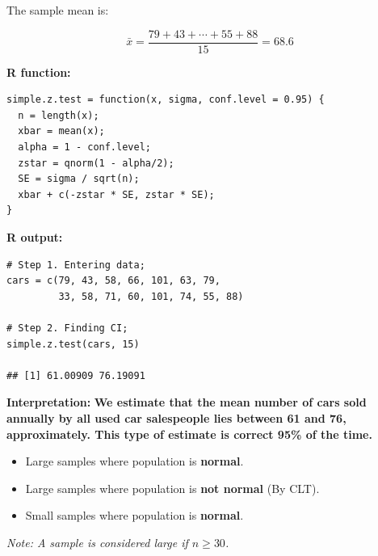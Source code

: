 \noindent The sample mean is:

\[
\bar{x} = \frac{79 + 43 + \cdots + 55 + 88}{15} = 68.6
\]

\vspace{1em}

\noindent\textbf{R function:}

\begin{tcolorbox}[colback=gray!10, colframe=gray!50, arc=2mm]
\begin{verbatim}
simple.z.test = function(x, sigma, conf.level = 0.95) {
  n = length(x);
  xbar = mean(x);
  alpha = 1 - conf.level;
  zstar = qnorm(1 - alpha/2);
  SE = sigma / sqrt(n);
  xbar + c(-zstar * SE, zstar * SE);
}
\end{verbatim}
\end{tcolorbox}

\vspace{0.5em}

\noindent\textbf{R output:}

\begin{tcolorbox}[colback=gray!10, colframe=gray!50, arc=2mm]
\begin{verbatim}
# Step 1. Entering data;
cars = c(79, 43, 58, 66, 101, 63, 79,
         33, 58, 71, 60, 101, 74, 55, 88)

# Step 2. Finding CI;
simple.z.test(cars, 15)

## [1] 61.00909 76.19091
\end{verbatim}
\end{tcolorbox}

\vspace{1em}

\noindent\textbf{Interpretation:} \textbf{We estimate that the mean number of cars sold annually by all used car salespeople lies between 61 and 76, approximately. This type of estimate is correct 95\% of the time.}

\vspace{1em}

\begin{tcolorbox}[colback=blue!5!white, colframe=blue!75!black,
  title=\textbf{Cases Where Valid}, fonttitle=\bfseries,
  coltitle=white, colbacktitle=blue!90!black, arc=2mm]

\begin{itemize}
  \item Large samples where population is \textbf{normal}.
  \item Large samples where population is \textbf{not normal} (By CLT).
  \item Small samples where population is \textbf{normal}.
\end{itemize}

\textit{Note: A sample is considered large if $n \geq 30$.}
\end{tcolorbox}

